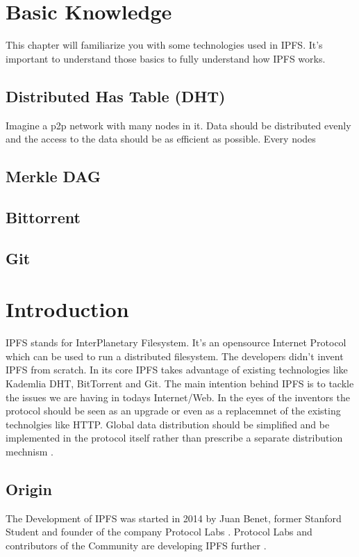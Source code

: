 \documentclass[a4paper,11pt, oneside]{report}
\theoremstyle{definition}
\begin{document}
\chapter{Basic Knowledge}
This chapter will familiarize you with some technologies used in IPFS. It's important to understand those basics to fully understand how IPFS works.

\section{Distributed Has Table (DHT)}
Imagine a p2p network with many nodes in it. Data should be distributed evenly and the access to the data should be as efficient as possible. Every nodes 





\section{Merkle DAG}
\section{Bittorrent}
\section{Git}


\chapter{Introduction}
IPFS stands for InterPlanetary Filesystem. It's an opensource Internet Protocol which can be used to run a distributed filesystem.
The developers didn't invent IPFS from scratch. In its core IPFS takes advantage of existing technologies like Kademlia DHT, BitTorrent and Git. The main intention behind IPFS is to tackle the issues  we are having in todays Internet/Web. In the eyes of the inventors the protocol should be seen as an upgrade or even as a replacemnet of the existing technolgies like HTTP. Global data distribution should be simplified and be implemented in the protocol itself rather than prescribe a separate distribution mechnism \cite{IPFSBasics}.

\section{Origin}
The Development of IPFS was started in 2014 by Juan Benet, former Stanford Student and founder of the company Protocol Labs . Protocol Labs and contributors of the Community are developing IPFS further \cite{LinkedIn}.
\end{document}
